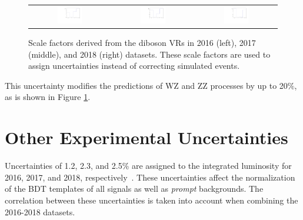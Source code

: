 \begin{figure}[tbh!]
 \begin{center}
 \begin{tabular}{ccc}
 \includegraphics[width=0.325\textwidth]{figures/Part3/Systematics/2016_VV_Sys_1D}&
 \includegraphics[width=0.325\textwidth]{figures/Part3/Systematics/2017_VV_Sys_1D}&
 \includegraphics[width=0.325\textwidth]{figures/Part3/Systematics/2018_VV_Sys_1D}\\
 \end{tabular}
 \caption{Scale factors derived from the diboson \acp{VR} in 2016 (left), 2017 (middle), and 2018 (right) datasets. These scale factors are used to assign uncertainties instead of correcting simulated events.}
 \label{fig:SF_VV}
 \end{center}
\end{figure}

This uncertainty modifies the predictions of WZ and ZZ processes by up to 20$\%$, as is shown in Figure \ref{fig:SF_VV}.

\section{Other Experimental Uncertainties}
\label{sec:OthUnc}

Uncertainties of 1.2, 2.3, and 2.5\% are assigned to the integrated luminosity for 2016, 2017, and 2018, respectively~\cite{CMS:2021xjt,CMS-LUM-17-004,CMS-LUM-18-002}. These uncertainties affect the normalization of the \ac{BDT} templates of all signals as well as \emph{prompt} backgrounds. The correlation between these uncertainties is taken into account when combining the 2016-2018 datasets. 

